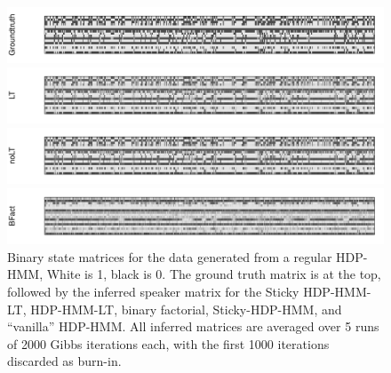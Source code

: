 \begin{figure}[tb]
\begin{center}
  \centerline{\includegraphics[width = \textwidth, height = 0.2\textwidth]{fig/synth16/groundtruth.pdf}}
  \centerline{\includegraphics[width = \textwidth, height = 0.2\textwidth]{fig/synth16/LT_hdp_hmm_w0/binary_state.pdf}}
  \centerline{\includegraphics[width = \textwidth, height = 0.2\textwidth]{fig/synth16/noLT_hdp_hmm_w0/binary_state.pdf}}
  \centerline{\includegraphics[width = \textwidth, height = 0.2\textwidth]{fig/synth16/BFact_hmm_w0/binary_state.pdf}}
\caption{Binary state matrices for the data generated from a regular HDP-HMM, 
  White is 1, black is 0.  The ground truth matrix is at the top, followed by the 
  inferred speaker matrix for the
  Sticky HDP-HMM-LT, HDP-HMM-LT, binary factorial, Sticky-HDP-HMM, and
  ``vanilla'' HDP-HMM.  All inferred matrices are averaged over 5 runs
  of 2000 Gibbs iterations each, with the first 1000 iterations
  discarded as burn-in. \label{fig:synthetic-binary-matrices}}
\end{center}
\end{figure}
